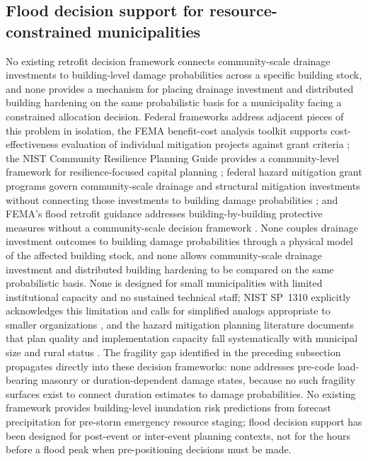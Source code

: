 \documentclass[11pt]{article}
\begin{document}
\subsection{Flood decision support for resource-constrained municipalities}
No existing retrofit decision framework connects community-scale drainage investments
to building-level damage probabilities across a specific building stock, and none
provides a mechanism for placing drainage investment and distributed building
hardening on the same probabilistic basis for a municipality facing a constrained
allocation decision.
Federal frameworks address adjacent pieces of this problem in isolation, the FEMA
benefit-cost analysis toolkit supports cost-effectiveness evaluation of individual
mitigation projects against grant criteria \cite{fema2019bcatoolkit}; the NIST
Community Resilience Planning Guide provides a community-level framework for
resilience-focused capital planning \cite{mcallister2015nist1190v1,mcallister2015nist1190v2}; federal hazard
mitigation grant programs govern community-scale drainage and structural mitigation
investments without connecting those investments to building damage probabilities
\cite{fema2023hmaguide}; and FEMA's flood retrofit guidance addresses
building-by-building protective measures without a community-scale decision
framework \cite{fema2014p312,fema2012p259}.
None couples drainage investment outcomes to building damage probabilities through
a physical model of the affected building stock, and none allows community-scale
drainage investment and distributed building hardening to be compared on the same
probabilistic basis.
None is designed for small municipalities with limited institutional capacity and
no sustained technical staff; NIST SP~1310 explicitly acknowledges this limitation
and calls for simplified analogs appropriate to smaller organizations
\cite[Sec.~6.1.3]{davis2024nist}, and the hazard mitigation planning literature
documents that plan quality and implementation capacity fall systematically with
municipal size and rural status
\cite{smith2013statecapacity,horney2012ruralstatus,smith2026ruralcapacity}.
The fragility gap identified in the preceding subsection propagates directly into
these decision frameworks: none addresses pre-code load-bearing masonry or
duration-dependent damage states, because no such fragility surfaces exist to
connect duration estimates to damage probabilities.
No existing framework provides building-level inundation risk predictions from
forecast precipitation for pre-storm emergency resource staging; flood decision
support has been designed for post-event or inter-event planning contexts, not
for the hours before a flood peak when pre-positioning decisions must be made.
\end{document}
